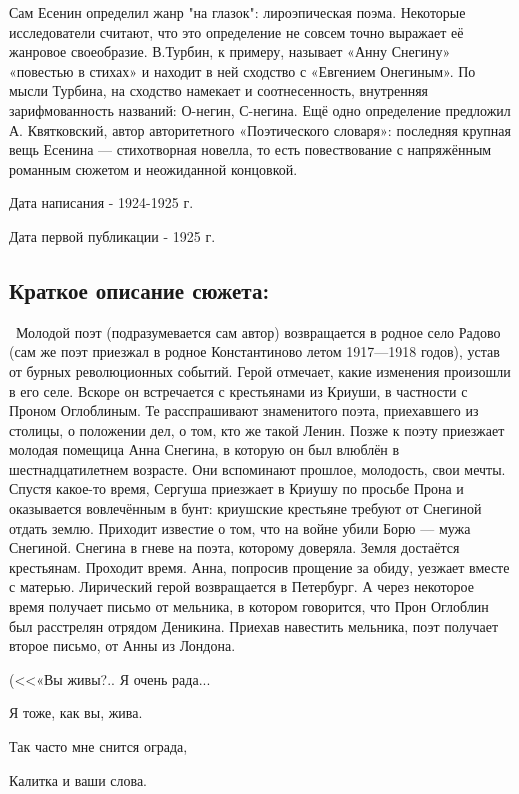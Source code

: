 \documentclass[a4paper,12pt]{article}
\begin{document}
	\noindent
	Сам Есенин определил жанр "на глазок": лироэпическая поэма. Некоторые исследователи считают, что это определение не совсем точно выражает её жанровое своеобразие. В.Турбин, к примеру, называет «Анну Снегину» «повестью в стихах» и находит в ней сходство с «Евгением Онегиным». По мысли Турбина, на сходство намекает и соотнесенность, внутренняя зарифмованность названий: О-негин, С-негина. Ещё одно определение предложил А. Квятковский, автор авторитетного «Поэтического словаря»: последняя крупная вещь Есенина — стихотворная новелла, то есть повествование с напряжённым романным сюжетом и неожиданной концовкой. 
	
	\noindent
	Дата написания - 1924-1925 г.
	
	\noindent
	Дата первой публикации - 1925 г.
	
	\subsection{Краткое описание сюжета: }
	\quad \, Молодой поэт (подразумевается сам автор) возвращается в родное село Радово (сам же поэт приезжал в родное Константиново летом 1917—1918 годов), устав от бурных революционных событий. Герой отмечает, какие изменения произошли в его селе. Вскоре он встречается с крестьянами из Криуши, в частности с Проном Оглоблиным. Те расспрашивают знаменитого поэта, приехавшего из столицы, о положении дел, о том, кто же такой Ленин. Позже к поэту приезжает молодая помещица Анна Снегина, в которую он был влюблён в шестнадцатилетнем возрасте. Они вспоминают прошлое, молодость, свои мечты. Спустя какое-то время, Сергуша приезжает в Криушу по просьбе Прона и оказывается вовлечённым в бунт: криушские крестьяне требуют от Снегиной отдать землю. Приходит известие о том, что на войне убили Борю — мужа Снегиной. Снегина в гневе на поэта, которому доверяла. Земля достаётся крестьянам. Проходит время. Анна, попросив прощение за обиду, уезжает вместе с матерью. Лирический герой возвращается в Петербург. А через некоторое время получает письмо от мельника, в котором говорится, что Прон Оглоблин был расстрелян отрядом Деникина. Приехав навестить мельника, поэт получает второе письмо, от Анны из Лондона.
	
	\noindent
	(<<«Вы живы?.. Я очень рада...
	
	\noindent
	Я тоже, как вы, жива.
	
	\noindent
	Так часто мне снится ограда,
	
	\noindent
	Калитка и ваши слова.
	
\end{document}
